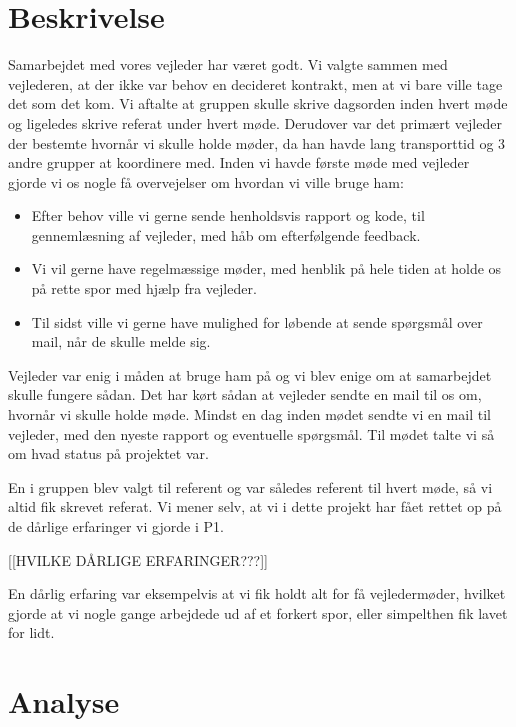 \section{Beskrivelse}
Samarbejdet med vores vejleder har været godt. Vi valgte sammen med vejlederen, at der ikke var behov en decideret kontrakt, men at vi bare ville tage det som det kom. Vi aftalte at gruppen skulle skrive dagsorden inden hvert møde og ligeledes skrive referat under hvert møde. Derudover var det primært vejleder der bestemte hvornår vi skulle holde møder, da han havde lang transporttid og 3 andre grupper at koordinere med. Inden vi havde første møde med vejleder gjorde vi os nogle få overvejelser om hvordan vi ville bruge ham:
\begin{itemize}
\item	Efter behov ville vi gerne sende henholdsvis rapport og kode, til gennemlæsning af vejleder, med håb om efterfølgende feedback.

\item	Vi vil gerne have regelmæssige møder, med henblik på hele tiden at holde os på rette spor med hjælp fra vejleder.

\item Til sidst ville vi gerne have mulighed for løbende at sende spørgsmål over mail, når de skulle melde sig.
\end{itemize}
Vejleder var enig i måden at bruge ham på og vi blev enige om at samarbejdet skulle fungere sådan. Det har kørt sådan at vejleder sendte en mail til os om, hvornår vi skulle holde møde. Mindst en dag inden mødet sendte vi en mail til vejleder, med den nyeste rapport og eventuelle spørgsmål. Til mødet talte vi så om hvad status på projektet var. 

En i gruppen blev valgt til referent og var således referent til hvert møde, så vi altid fik skrevet referat. Vi mener selv, at vi i dette projekt har fået rettet op på de dårlige erfaringer vi gjorde i P1.


[[HVILKE DÅRLIGE ERFARINGER???]]


En dårlig erfaring var eksempelvis at vi fik holdt alt for få vejledermøder, hvilket gjorde at vi nogle gange arbejdede ud af et forkert spor, eller simpelthen fik lavet for lidt. 

\section{Analyse}

